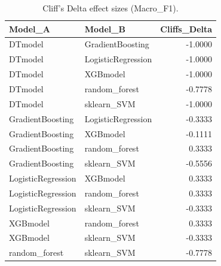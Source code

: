 \begin{table}[t]
\centering
\begin{tabular}{llr}
\toprule
Model_A & Model_B & Cliffs_Delta \\
\midrule
DTmodel & GradientBoosting & -1.0000 \\
DTmodel & LogisticRegression & -1.0000 \\
DTmodel & XGBmodel & -1.0000 \\
DTmodel & random_forest & -0.7778 \\
DTmodel & sklearn_SVM & -1.0000 \\
GradientBoosting & LogisticRegression & -0.3333 \\
GradientBoosting & XGBmodel & -0.1111 \\
GradientBoosting & random_forest & 0.3333 \\
GradientBoosting & sklearn_SVM & -0.5556 \\
LogisticRegression & XGBmodel & 0.3333 \\
LogisticRegression & random_forest & 0.3333 \\
LogisticRegression & sklearn_SVM & -0.3333 \\
XGBmodel & random_forest & 0.3333 \\
XGBmodel & sklearn_SVM & -0.3333 \\
random_forest & sklearn_SVM & -0.7778 \\
\bottomrule
\end{tabular}
\caption{Cliff's Delta effect sizes (Macro_F1).}
\label{tab:cliffs_Macro_F1}
\end{table}